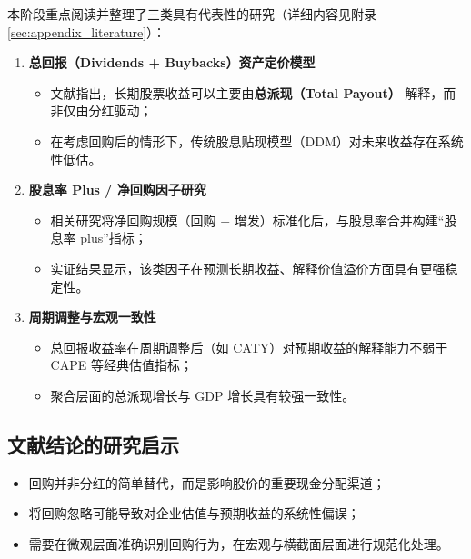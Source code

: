 \documentclass[a4paper,10pt]{article}
\begin{document}
本阶段重点阅读并整理了三类具有代表性的研究（详细内容见附录\ref{sec:appendix_literature}）：

\begin{enumerate}
    \item \textbf{总回报（Dividends + Buybacks）资产定价模型}
    \begin{itemize}
        \item 文献指出，长期股票收益可以主要由\textbf{总派现（Total Payout）} 解释，而非仅由分红驱动；
        \item 在考虑回购后的情形下，传统股息贴现模型（DDM）对未来收益存在系统性低估。
    \end{itemize}

    \item \textbf{股息率 Plus / 净回购因子研究}
    \begin{itemize}
        \item 相关研究将净回购规模（回购 $-$ 增发）标准化后，与股息率合并构建“股息率 plus”指标；
        \item 实证结果显示，该类因子在预测长期收益、解释价值溢价方面具有更强稳定性。
    \end{itemize}

    \item \textbf{周期调整与宏观一致性}
    \begin{itemize}
        \item 总回报收益率在周期调整后（如 CATY）对预期收益的解释能力不弱于 CAPE 等经典估值指标；
        \item 聚合层面的总派现增长与 GDP 增长具有较强一致性。
    \end{itemize}
\end{enumerate}

\subsection{文献结论的研究启示}

\begin{itemize}
    \item 回购并非分红的简单替代，而是影响股价的重要现金分配渠道；
    \item 将回购忽略可能导致对企业估值与预期收益的系统性偏误；
    \item 需要在微观层面准确识别回购行为，在宏观与横截面层面进行规范化处理。
\end{itemize}
\end{document}
